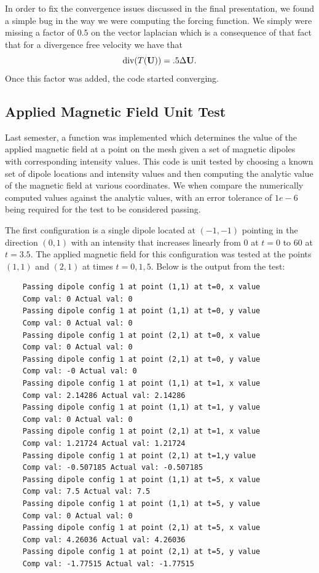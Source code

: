 \documentclass[11pt,fullpage]{article}
\newcommand{\lap}{\Delta}
\newcommand{\diver}{\textup{div} }
\theoremstyle{lemma}
\theoremstyle{definition}
\theoremstyle{lemma}
\begin{document}
In order to fix the convergence issues discussed in the final presentation, we found a simple bug in the way we were computing the forcing function. We simply were missing a factor of $0.5$ on the vector laplacian which is a consequence of that fact that for a divergence free velocity we have that
$$
	\diver(T(\mathbf{U})) = .5 \lap \mathbf{U}.
$$
Once this factor was added, the code started converging.

\subsection{Applied Magnetic Field Unit Test}
Last semester, a function was implemented which determines the value of the applied magnetic field at a point on the mesh given a set of magnetic dipoles with corresponding intensity values. This code is unit tested by choosing a known set of dipole locations and intensity values and then computing the analytic value of the magnetic field at various coordinates. We when compare the numerically computed values against the analytic values, with an error tolerance of $1e-6$ being required for the test to be considered passing.

The first configuration is a single dipole located at $(-1,-1)$ pointing in the direction $(0,1)$ with an intensity that increases linearly from $0$ at $t=0$ to $60$ at $t=3.5$. The applied magnetic field for this configuration was tested at the points $(1,1)$ and $(2,1)$ at times $t=0,1,5$. Below is the output from the test:
\begin{verbatim}
	Passing dipole config 1 at point (1,1) at t=0, x value
	Comp val: 0 Actual val: 0
	Passing dipole config 1 at point (1,1) at t=0, y value
	Comp val: 0 Actual val: 0
	Passing dipole config 1 at point (2,1) at t=0, x value
	Comp val: 0 Actual val: 0
	Passing dipole config 1 at point (2,1) at t=0, y value
	Comp val: -0 Actual val: 0
	Passing dipole config 1 at point (1,1) at t=1, x value
	Comp val: 2.14286 Actual val: 2.14286
	Passing dipole config 1 at point (1,1) at t=1, y value
	Comp val: 0 Actual val: 0
	Passing dipole config 1 at point (2,1) at t=1, x value
	Comp val: 1.21724 Actual val: 1.21724
	Passing dipole config 1 at point (2,1) at t=1,y value
	Comp val: -0.507185 Actual val: -0.507185
	Passing dipole config 1 at point (1,1) at t=5, x value
	Comp val: 7.5 Actual val: 7.5
	Passing dipole config 1 at point (1,1) at t=5, y value
	Comp val: 0 Actual val: 0
	Passing dipole config 1 at point (2,1) at t=5, x value
	Comp val: 4.26036 Actual val: 4.26036
	Passing dipole config 1 at point (2,1) at t=5, y value
	Comp val: -1.77515 Actual val: -1.77515
\end{verbatim}
\end{document}
